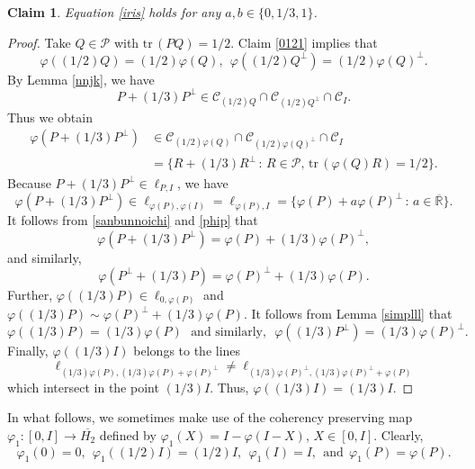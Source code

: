 \documentclass[10pt]{amsart}
\newtheorem{claim}[theorem]{Claim}
\theoremstyle{definition}
\theoremstyle{remark}
\numberwithin{subsection}{section}
\numberwithin{equation}{section}
\newcommand\oH{{\overline{H_2}}}
\newcommand\oR{{\overline{\mathbb{R}}}}
\begin{document}
\begin{claim}\label{013}
Equation \eqref{iris} holds for any $a, b\in \{0, 1/3, 1\}$. 
\end{claim}
\begin{proof}
Take $Q \in \mathcal{P}$ with $\mathrm{tr}\, (PQ) = 1/2$. 
Claim \ref{0121} implies that 
\[
\varphi ((1/2)Q) = (1/2)\varphi (Q),\ \ \varphi ((1/2)Q^\perp) = (1/2)\varphi (Q)^\perp.
\] 
By Lemma \ref{nnjk}, we have
\[
P + (1/3)P^\perp \in 
\mathcal{C}_{(1/2)Q} \cap \mathcal{C}_{(1/2)Q^\perp} \cap \mathcal{C}_I.
\]
Thus we obtain
\begin{equation}\label{sanbunnoichi}
\begin{split}
\varphi ( P + (1/3) P^\perp) &\in \mathcal{C}_{(1/2)\varphi (Q)} \cap \mathcal{C}_{(1/2)\varphi (Q)^\perp} \cap \mathcal{C}_I\\
&= \{ R + (1/3) R^\perp \, : \, R \in \mathcal{P}, \, \mathrm{tr}\, (\varphi (Q)R) = 1/2 \}.  
\end{split}
\end{equation}
Because $P + (1/3) P^\perp\in \ell_{P, I}$, we have 
\begin{equation}\label{phip}
\varphi ( P + (1/3) P^\perp)\in \ell_{\varphi(P), \varphi(I)}=\ell_{\varphi(P), I}  =
\{ \varphi (P) + a\varphi(P)^\perp   \, : \, a \in  {\oR} \}.
\end{equation}
It follows from \eqref{sanbunnoichi} and \eqref{phip} that
\[
\varphi (P + (1/3) P^\perp ) = \varphi (P) + (1/3) \varphi(P)^\perp,
\]
and similarly,
\[
\varphi (P^\perp + (1/3) P ) = \varphi (P)^\perp + (1/3) \varphi(P) .
\]
Further, $\varphi ((1/3)P)\in \ell_{0, \varphi(P)}$
and $\varphi ((1/3)P)   \sim  \varphi (P)^\perp + (1/3) \varphi(P)$. 
It follows from Lemma \ref{simplll} that 
\[
\varphi ( (1/3) P ) = (1/3) \varphi(P)  \ \ \ \text{and similarly,} \ \ \ \varphi ( (1/3) P^\perp ) = (1/3) \varphi(P)^\perp.
\]
Finally, $\varphi ((1/3)I)$ belongs to the lines 
\[
\ell_{(1/3)\varphi(P), (1/3)\varphi(P) + \varphi (P)^\perp} \not=\ell_{(1/3)\varphi(P)^\perp, (1/3)\varphi(P)^\perp + \varphi (P)}
\]
which intersect in the point $(1/3)I$. Thus,
$\varphi ((1/3)I) = (1/3)I$.
\end{proof}

In what follows, we sometimes make use of the coherency preserving map $\varphi_1 \colon [0,I] \to \oH$ defined by $\varphi_1 (X) = I - \varphi ( I -X)$, $X \in [0, I]$. Clearly, 
\[
\varphi_1 (0) = 0,\ \ \varphi_1 ((1/2)I) = (1/2)I,\ \ \varphi_1 (I) = I,\ \ \text{and}\ \ \varphi_1 (P) = \varphi (P).
\] 
\end{document}
